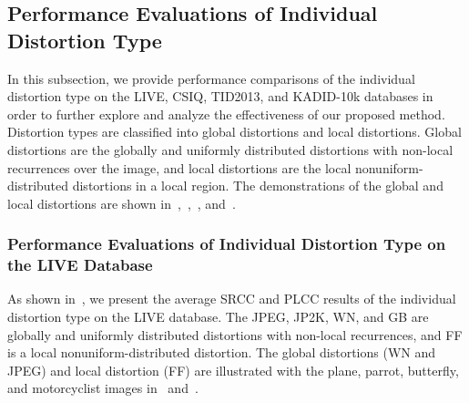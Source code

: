 \subsection{Performance Evaluations of Individual Distortion Type}\label{Performance Evaluations of Individual Distortion Type}
In this subsection, we provide performance comparisons of the individual distortion type on the LIVE, CSIQ, TID2013, and KADID-10k databases in order to further explore and analyze the effectiveness of our proposed method. Distortion types are classified into global distortions and local distortions. Global distortions are the globally and uniformly distributed distortions with non-local recurrences over the image, and local distortions are the local nonuniform-distributed distortions in a local region. The demonstrations of the global and local distortions are shown in~,~,~, and~.
	
	\subsubsection{Performance Evaluations of Individual Distortion Type on the LIVE Database}
	As shown in~, we present the average SRCC and PLCC results of the individual distortion type on the LIVE database. The JPEG, JP2K, WN, and GB are globally and uniformly distributed distortions with non-local recurrences, and FF is a local nonuniform-distributed distortion. The global distortions (WN and JPEG) and local distortion (FF) are illustrated with the plane, parrot, butterfly, and motorcyclist images in~ and~. 
	
